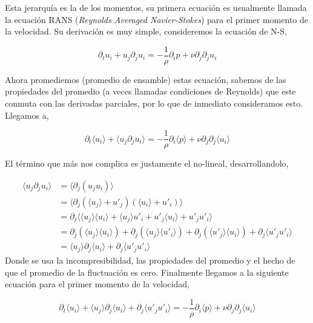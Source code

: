 \documentclass[executivepaper,12pt]{article}
\numberwithin{equation}{section}
\begin{document}
Esta jerarquía es la de los momentos, su primera ecuación es usualmente llamada la ecuación RANS (\textit{Reynolds Averaged Navier-Stokes}) para el primer momento de la velocidad. Su derivación es muy simple, consideremos la ecuación de N-S,

\begin{equation*}
	\partial_t u_i + u_j \partial_j u_i =-\frac{1}{\rho}\partial_i p +\nu \partial_j\partial_j u_i
\end{equation*}

Ahora promediemos (promedio de ensamble) estas ecuación, sabemos de las propiedades del promedio (a veces llamadas condiciones de Reynolds) que este conmuta con las derivadas parciales, por lo que de inmediato consideramos esto. Llegamos a,

\begin{equation*}
	\partial_t \langle u_i \rangle + \langle u_j \partial_j u_i \rangle = -\frac{1}{\rho}\partial_i \langle p \rangle +\nu  \partial_j\partial_j \langle u_i \rangle
\end{equation*}


El término que más nos complica es justamente el no-lineal, desarrollandolo,

\begin{align*}
	\langle u_j \partial_j u_i \rangle &= \langle  \partial_j (u_j u_i) \rangle \\
	&=\langle  \partial_j (\langle u_j \rangle + u'_j)(\langle u_i \rangle + u'_i) \rangle\\
	&=\partial_j \langle \langle u_j \rangle \langle u_i \rangle + \langle u_j \rangle u'_i + u'_j\langle u_i \rangle +u'_ju'_i \rangle\\
	&=\partial_j(\langle u_j \rangle \langle u_i \rangle) +\partial_j (\langle u_j \rangle \langle u'_i\rangle ) +\partial_j (\langle u'_j \rangle \langle u_i\rangle ) +\partial_j \langle u'_ju'_i \rangle\\
	&=\langle u_j \rangle \partial_j \langle u_i \rangle+\partial_j \langle u'_ju'_i \rangle
\end{align*}
Donde se usa la incompresibilidad, las propiedades del promedio y el hecho de que el promedio de la fluctuación es cero. Finalmente llegamos a la siguiente ecuación para el primer momento de la velocidad,

\begin{equation}
	\partial_t \langle u_i \rangle + \langle u_j \rangle \partial_j \langle u_i \rangle+\partial_j \langle u'_ju'_i \rangle = -\frac{1}{\rho}\partial_i \langle p \rangle +\nu  \partial_j\partial_j \langle u_i \rangle
\end{equation}
\end{document}
